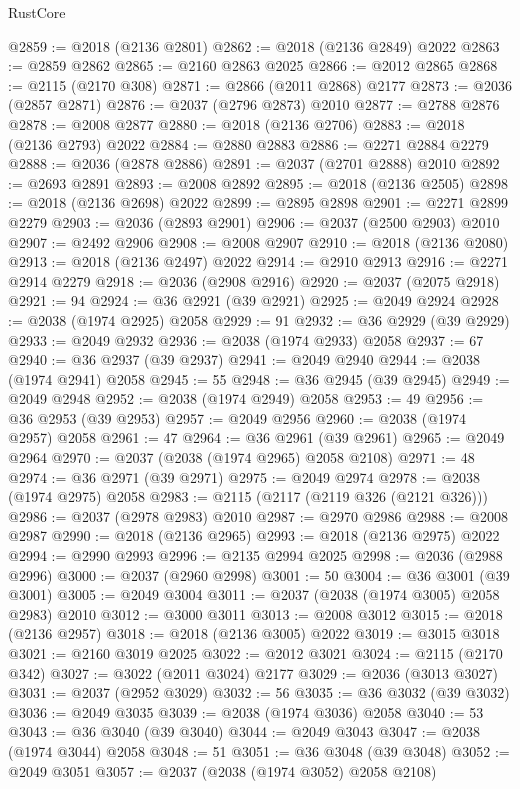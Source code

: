 \begin{lexlean}{RustCore}
\begin{coremodule}
@2859 := @2018 (@2136 @2801)
@2862 := @2018 (@2136 @2849) @2022
@2863 := @2859 @2862
@2865 := @2160 @2863 @2025
@2866 := @2012 @2865
@2868 := @2115 (@2170 @308)
@2871 := @2866 (@2011 @2868) @2177
@2873 := @2036 (@2857 @2871)
@2876 := @2037 (@2796 @2873) @2010
@2877 := @2788 @2876
@2878 := @2008 @2877
@2880 := @2018 (@2136 @2706)
@2883 := @2018 (@2136 @2793) @2022
@2884 := @2880 @2883
@2886 := @2271 @2884 @2279
@2888 := @2036 (@2878 @2886)
@2891 := @2037 (@2701 @2888) @2010
@2892 := @2693 @2891
@2893 := @2008 @2892
@2895 := @2018 (@2136 @2505)
@2898 := @2018 (@2136 @2698) @2022
@2899 := @2895 @2898
@2901 := @2271 @2899 @2279
@2903 := @2036 (@2893 @2901)
@2906 := @2037 (@2500 @2903) @2010
@2907 := @2492 @2906
@2908 := @2008 @2907
@2910 := @2018 (@2136 @2080)
@2913 := @2018 (@2136 @2497) @2022
@2914 := @2910 @2913
@2916 := @2271 @2914 @2279
@2918 := @2036 (@2908 @2916)
@2920 := @2037 (@2075 @2918)
@2921 := 94
@2924 := @36 @2921 (@39 @2921)
@2925 := @2049 @2924
@2928 := @2038 (@1974 @2925) @2058
@2929 := 91
@2932 := @36 @2929 (@39 @2929)
@2933 := @2049 @2932
@2936 := @2038 (@1974 @2933) @2058
@2937 := 67
@2940 := @36 @2937 (@39 @2937)
@2941 := @2049 @2940
@2944 := @2038 (@1974 @2941) @2058
@2945 := 55
@2948 := @36 @2945 (@39 @2945)
@2949 := @2049 @2948
@2952 := @2038 (@1974 @2949) @2058
@2953 := 49
@2956 := @36 @2953 (@39 @2953)
@2957 := @2049 @2956
@2960 := @2038 (@1974 @2957) @2058
@2961 := 47
@2964 := @36 @2961 (@39 @2961)
@2965 := @2049 @2964
@2970 := @2037 (@2038 (@1974 @2965) @2058 @2108)
@2971 := 48
@2974 := @36 @2971 (@39 @2971)
@2975 := @2049 @2974
@2978 := @2038 (@1974 @2975) @2058
@2983 := @2115 (@2117 (@2119 @326 (@2121 @326)))
@2986 := @2037 (@2978 @2983) @2010
@2987 := @2970 @2986
@2988 := @2008 @2987
@2990 := @2018 (@2136 @2965)
@2993 := @2018 (@2136 @2975) @2022
@2994 := @2990 @2993
@2996 := @2135 @2994 @2025
@2998 := @2036 (@2988 @2996)
@3000 := @2037 (@2960 @2998)
@3001 := 50
@3004 := @36 @3001 (@39 @3001)
@3005 := @2049 @3004
@3011 := @2037 (@2038 (@1974 @3005) @2058 @2983) @2010
@3012 := @3000 @3011
@3013 := @2008 @3012
@3015 := @2018 (@2136 @2957)
@3018 := @2018 (@2136 @3005) @2022
@3019 := @3015 @3018
@3021 := @2160 @3019 @2025
@3022 := @2012 @3021
@3024 := @2115 (@2170 @342)
@3027 := @3022 (@2011 @3024) @2177
@3029 := @2036 (@3013 @3027)
@3031 := @2037 (@2952 @3029)
@3032 := 56
@3035 := @36 @3032 (@39 @3032)
@3036 := @2049 @3035
@3039 := @2038 (@1974 @3036) @2058
@3040 := 53
@3043 := @36 @3040 (@39 @3040)
@3044 := @2049 @3043
@3047 := @2038 (@1974 @3044) @2058
@3048 := 51
@3051 := @36 @3048 (@39 @3048)
@3052 := @2049 @3051
@3057 := @2037 (@2038 (@1974 @3052) @2058 @2108)

\end{coremodule}
\end{lexlean}
